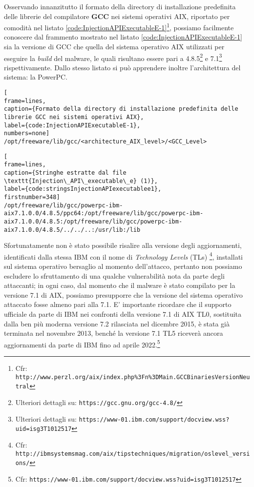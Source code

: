 \documentclass[10pt,a4paper, titlepage]{report}
\begin{document}
Osservando innanzitutto il formato della directory di installazione predefinita delle librerie del compilatore \textbf{GCC} nei sistemi operativi AIX, riportato per comodità nel listato \ref{code:InjectionAPIExecutableE-1}\footnote{Cfr: \texttt{http://www.perzl.org/aix/index.php\%3Fn\%3DMain.GCCBinariesVersionNeutral}}, possiamo facilmente conoscere dal frammento mostrato nel listato \ref{code:InjectionAPIExecutableE-1} sia la versione di GCC che quella del sistema operativo AIX utilizzati per eseguire la \textit{build} del malware, le quali risultano essere pari a 4.8.5\footnote{Ulteriori dettagli su: \texttt{https://gcc.gnu.org/gcc-4.8/}} e 7.1\footnote{Ulteriori dettagli su: \texttt{https://www-01.ibm.com/support/docview.wss?uid=isg3T1012517}} rispettivamente. Dallo stesso listato si può apprendere inoltre l'architettura del sistema: la PowerPC\texttrademark.

\begin{lstlisting}[
frame=lines, 
caption={Formato della directory di installazione predefinita delle librerie GCC nei sistemi operativi AIX}, 
label={code:InjectionAPIExecutableE-1},
numbers=none]
/opt/freeware/lib/gcc/<architecture_AIX_level>/<GCC_Level>
\end{lstlisting}

\begin{lstlisting}[
frame=lines, 
caption={Stringhe estratte dal file \texttt{Injection\_API\_executable\_e} (1)}, 
label={code:stringsInjectionAPIexecutablee1},
firstnumber=348]
/opt/freeware/lib/gcc/powerpc-ibm-aix7.1.0.0/4.8.5/ppc64:/opt/freeware/lib/gcc/powerpc-ibm-aix7.1.0.0/4.8.5:/opt/freeware/lib/gcc/powerpc-ibm-aix7.1.0.0/4.8.5/../../..:/usr/lib:/lib
\end{lstlisting}

Sfortunatamente non è stato possibile risalire alla versione degli aggiornamenti, identificati dalla stessa IBM con il nome di \textit{Technology Levels} (TLs) \footnote{Cfr: \texttt{http://ibmsystemsmag.com/aix/tipstechniques/migration/oslevel\_versions/}}, installati sul sistema operativo bersaglio al momento dell'attacco, pertanto non possiamo escludere lo sfruttamento di una qualche vulnerabilità nota da parte degli attaccanti; in ogni caso, dal momento che il malware è stato compilato per la versione 7.1 di AIX, possiamo presupporre che la versione del sistema operativo attaccato fosse almeno pari alla 7.1. E' importante ricordare che   il supporto ufficiale da parte di IBM nei confronti della versione 7.1 di AIX TL0, sostituita dalla ben più moderna versione 7.2 rilasciata nel dicembre 2015, è stata già terminata nel novembre 2013, benché la versione 7.1 TL5 riceverà ancora aggiornamenti da parte di IBM fino ad aprile 2022.\footnote{Cfr: \texttt{https://www-01.ibm.com/support/docview.wss?uid=isg3T1012517}}
\end{document}
